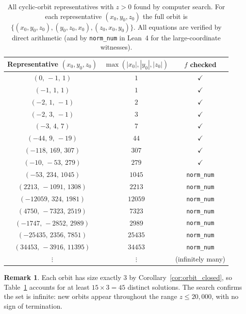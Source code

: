 \documentclass[12pt,a4paper]{article}
\theoremstyle{definition}
\newtheorem{remark}[theorem]{Remark}
\begin{document}
\begin{table}[h]
\centering
\caption{All cyclic-orbit representatives with $z>0$ found by
  computer search.  For each representative $(x_0,y_0,z_0)$ the full
  orbit is $\{(x_0,y_0,z_0),(y_0,z_0,x_0),(z_0,x_0,y_0)\}$.
  All equations are verified by direct arithmetic
  (and by \texttt{norm\_num} in Lean~4 for the large-coordinate witnesses).}
\label{tab:orbits}
\begin{tabular}{ccc}
\toprule
Representative $(x_0,y_0,z_0)$ & $\max(|x_0|,|y_0|,|z_0|)$ & $f$ checked \\
\midrule
$(0,\,-1,\,1)$ & $1$ & $\checkmark$ \\
$(-1,\,1,\,1)$ & $1$ & $\checkmark$ \\
$(-2,\,1,\,-1)$ & $2$ & $\checkmark$ \\
$(-2,\,3,\,-1)$ & $3$ & $\checkmark$ \\
$(-3,\,4,\,7)$ & $7$ & $\checkmark$ \\
$(-44,\,9,\,-19)$ & $44$ & $\checkmark$ \\
$(-118,\,169,\,307)$ & $307$ & $\checkmark$ \\
$(-10,\,-53,\,279)$ & $279$ & $\checkmark$ \\%
$(-53,\,234,\,1045)$ & $1045$ & \texttt{norm\_num} \\
$(2213,\,-1091,\,1308)$ & $2213$ & \texttt{norm\_num} \\
$(-12059,\,324,\,1981)$ & $12059$ & \texttt{norm\_num} \\
$(4750,\,-7323,\,2519)$ & $7323$ & \texttt{norm\_num} \\
$(-1747,\,-2852,\,2989)$ & $2989$ & \texttt{norm\_num} \\
$(-25435,\,2356,\,7851)$ & $25435$ & \texttt{norm\_num} \\
$(34453,\,-3916,\,11395)$ & $34453$ & \texttt{norm\_num} \\
$\vdots$ & $\vdots$ & (infinitely many) \\
\bottomrule
\end{tabular}
\end{table}

\begin{remark}
  Each orbit has size exactly $3$ by Corollary~\ref{cor:orbit_closed},
  so Table~\ref{tab:orbits} accounts for at least $15 \times 3 = 45$
  distinct solutions.  The search confirms the set is infinite: new
  orbits appear throughout the range $z \le 20{,}000$, with no sign of
  termination.
\end{remark}
\end{document}
